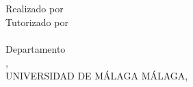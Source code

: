 \vspace*{-10mm}
\hspace*{-10mm}
\begin{minipage}{0.6\textwidth}
  \begin{center}
    \MakeUppercase{\facultad}
    \bigbreak
    \grado \\
    \especialidad
    \bigbreak
    \tituloes \\
    \tituloen
    \bigbreak
    Realizado por \\
    \alumno
    \bigbreak
    Tutorizado por \\
    \tutor \\
    \bigbreak
    Departamento \\
    \departamento,\\
    UNIVERSIDAD DE MÁLAGA
    \bigbreak
    MÁLAGA, \fecha
  \end{center}
\end{minipage}
